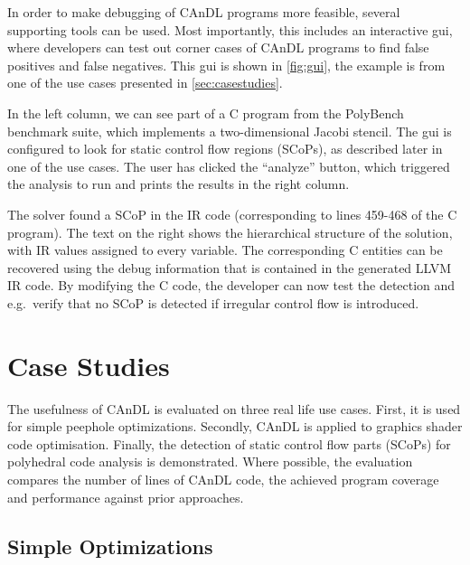     In order to make debugging of CAnDL programs more feasible, several
    supporting tools can be used.
    Most importantly, this includes an interactive gui, where developers can
    test out corner cases of CAnDL programs to find false positives and false
    negatives.
    This gui is shown in \autoref{fig:gui}, the example is from one of the use
    cases presented in \autoref{sec:casestudies}.

    In the left column, we can see part of a C program from the PolyBench
    benchmark suite, which implements a two-dimensional Jacobi stencil.
    The gui is configured to look for static control flow regions (SCoPs), as
    described later in one of the use cases.
    The user has clicked the ``analyze'' button, which triggered the analysis to
    run and prints the results in the right column.

    The solver found a SCoP in the IR code (corresponding to lines 459-468 of
    the C program).
    The text on the right shows the hierarchical structure of the solution, with
    IR values assigned to every variable.
    The corresponding C entities can be recovered using the debug
    information that is contained in the generated LLVM IR code.
    By modifying the C code, the developer can now test the detection and
    e.g.\ verify that no SCoP is detected if irregular control flow is
    introduced.

\section{Case Studies}
\label{sec:casestudies}

    The usefulness of CAnDL is evaluated on three real life use cases.
    First, it is used for simple peephole optimizations.
    Secondly, CAnDL is applied to graphics shader code optimisation.
    Finally, the detection of static control flow parts (SCoPs) for polyhedral
    code analysis is demonstrated.
    Where possible, the evaluation compares the number of lines of CAnDL code,
    the achieved program coverage and performance against prior approaches.

\subsection{Simple Optimizations}

